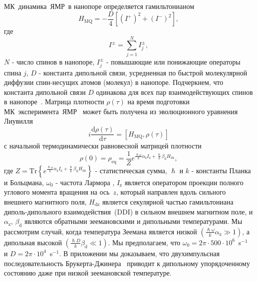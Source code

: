 \documentclass[utf8]{jetp}
\begin{document}
МК~динамика~ЯМР~в нанопоре определяется гамильтонианом~\cite{Doronin_2019,Doronin_2009}
%
\begin{equation}
  \label{eq:1}
  H_{\mathrm{MQ}} = - \dfrac{D}{4} \left[
    \left(I^{+}\right)^{2}
    + \left(I^{-}\right)^{2}
  \right] ,
\end{equation}
%
где
%
\begin{equation}
  \label{eq:2}
  I^{\pm} = \sum\limits_{j=1}^{N} I_{j}^{\pm},
\end{equation}
%
$N$ - число спинов в нанопоре, $I^{\pm}_{j}$ - повышающие или понижающие операторы спина $j$, $D$ - константа дипольной связи, усредненная по быстрой молекулярной диффузии спин-несущих атомов (молекул) в нанопоре.
Подчеркнем, что константа дипольной связи $D$ одинакова для всех пар взаимодействующих спинов в нанопоре~\cite{Doronin_2019,Doronin_2009}.
Матрица плотности $\rho(\tau)$ на время подготовки МК~эксперимента~ЯМР~\cite{Baum_1985} может быть получена из эволюционного уравнения Лиувилля~\cite{Goldman_1970,Abragam_1982}
%
\begin{equation}
  \label{eq:3}
  i\dfrac{\mathrm{d}\rho(\tau)}{\mathrm{d}\tau} = \left[
  H_\mathrm{MQ},\rho(\tau)
  \right]
\end{equation}
%
с начальной термодинамически равновесной матрицей плотности
%
\begin{equation}
  \label{eq:4}
    \rho(0) = \rho_\mathrm{eq} = \dfrac{1}{Z}
    e^{
      \frac{\hslash \omega}{k} \alpha_\mathrm{z} I_\mathrm{z}
      + \frac{\hslash }{k} \beta_\mathrm{d} H_\mathrm{dz}
    },
\end{equation}
%
где
$Z = \mathrm{Tr} \left\{ e^{\frac{\hslash \omega}{k} \alpha_\mathrm{z} I_\mathrm{z} + \frac{\hslash }{k} \beta_\mathrm{d} H_\mathrm{dz}} \right\}$ - статистическая сумма,
$\hslash$ и $k$ - константы Планка и Больцмана,
$\omega_{0}$ - частота Лармора , 
$I_\mathrm{z}$ является оператором проекции полного углового момента вращения на ось~$z$,
который направлен вдоль сильного внешнего магнитного поля,
$H_\mathrm{dz}$ является секулярной частью гамильтониана диполь-дипольного взаимодействия~(DDI) в сильном внешнем магнитном поле, 
и $\alpha_\mathrm{z}$, $\beta_\mathrm{d}$ являются обратными зеемановскими и дипольными температурами.
Мы рассмотрим случай, когда температура Зеемана является низкой $({\frac{\hslash \omega}{k} \alpha_\mathrm{z}}\gg 1)$, 
а дипольная высокой $\left( \frac{\hslash{D}}{k}\beta_\mathrm{d} \ll 1\right)$.
Мы предполагаем, что $\omega_{0} = 2\pi \cdot 500 \cdot 10^{6}$~s$^{-1}$ и $D = 2\pi \cdot 10^{4}$~s$^{-1}$.
В приложении мы доказываем, что двухимпульсная последовательность Брукерта-Джинера~\cite{Goldman_1970,Jeener_1967} приводит к дипольному упорядоченному состоянию даже при низкой зеемановской температуре.
\end{document}
